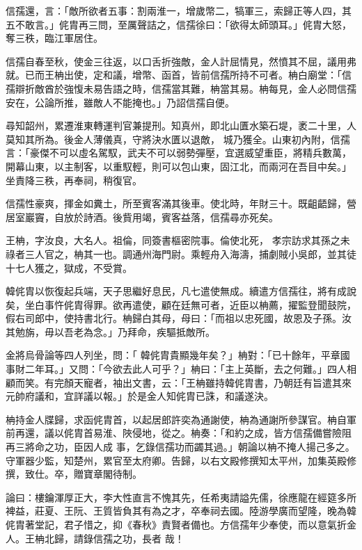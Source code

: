 \begin{pinyinscope}
 信孺還，言：「敵所欲者五事：割兩淮一，增歲幣二，犒軍三，索歸正等人四，其五不敢言。」侂胄再三問，至厲聲詰之，信孺徐曰：「欲得太師頭耳。」侂胄大怒，
 奪三秩，臨江軍居住。



 信孺自春至秋，使金三往返，以口舌折強敵，金人計屈情見，然憤其不屈，議用弗就。已而王柟出使，定和議，增幣、函首，皆前信孺所持不可者。柟白廟堂：「信孺辯折敵酋於強愎未易告語之時，信孺當其難，柟當其易。柟每見，金人必問信孺安在，公論所推，雖敵人不能掩也。」乃詔信孺自便。



 尋知韶州，累遷淮東轉運判官兼提刑。知真州，即北山匱水築石堤，袤二十里，人莫知其所為。後金人薄儀真，守將決水匱以退敵，
 城乃獲全。山東初內附，信孺言：「豪傑不可以虛名駕馭，武夫不可以弱勢彈壓，宜選威望重臣，將精兵數萬，開幕山東，以主制客，以重馭輕，則可以包山東，固江北，而兩河在吾目中矣。」坐責降三秩，再奉祠，稍復官。



 信孺性豪爽，揮金如糞土，所至賓客滿其後車。使北時，年財三十。既齟齬歸，營居室巖竇，自放於詩酒。後貲用竭，賓客益落，信孺尋亦死矣。



 王柟，字汝良，大名人。祖倫，同簽書樞密院事。倫使北死，
 孝宗訪求其孫之未祿者三人官之，柟其一也。調通州海門尉。乘輕舟入海濤，捕劇賊小吳郎，並其徒十七人獲之，獄成，不受賞。



 韓侂胄以恢復起兵端，天子思繼好息民，凡七遣使無成。續遣方信孺往，將有成說矣，坐白事忤侂胄得罪。欲再遣使，顧在廷無可者，近臣以柟薦，擢監登聞鼓院，假右司郎中，使持書北行。柟歸白其母，母曰：「而祖以忠死國，故恩及子孫。汝其勉旃，毋以吾老為念。」乃拜命，疾驅抵敵所。



 金將烏骨論等四人列坐，問：「
 韓侂胄貴顯幾年矣？」柟對：「已十餘年，平章國事財二年耳。」又問：「今欲去此人可乎？」柟曰：「主上英斷，去之何難。」四人相顧而笑。有完顏天寵者，袖出文書，云：「王柟雖持韓侂胄書，乃朝廷有旨遣其來元帥府議和，宜詳議以報。」於是金人知侂胄已誅，和議遂決。



 柟持金人牒歸，求函侂胄首，以起居郎許奕為通謝使，柟為通謝所參謀官。柟自軍前再還，議以侂胄首易淮、陜侵地，從之。柟奏：「和約之成，皆方信孺備嘗險阻再三將命之功，臣因人成
 事，乞錄信孺功而蠲其過。」朝論以柟不掩人揚己多之。守軍器少監，知楚州，累官至太府卿。告歸，以右文殿修撰知太平州，加集英殿修撰，致仕。卒，贈寶章閣待制。



 論曰：樓鑰渾厚正大，李大性直言不愧其先，任希夷請謚先儒，徐應龍在經筵多所裨益，莊夏、王阮、王質皆負其有為之才，卒奉祠去國。陸游學廣而望隆，晚為韓侂胄著堂記，君子惜之，抑《春秋》責賢者備也。方信孺年少奉使，而以意氣折金人。王柟北歸，請錄信孺之功，長者
 哉！



\end{pinyinscope}